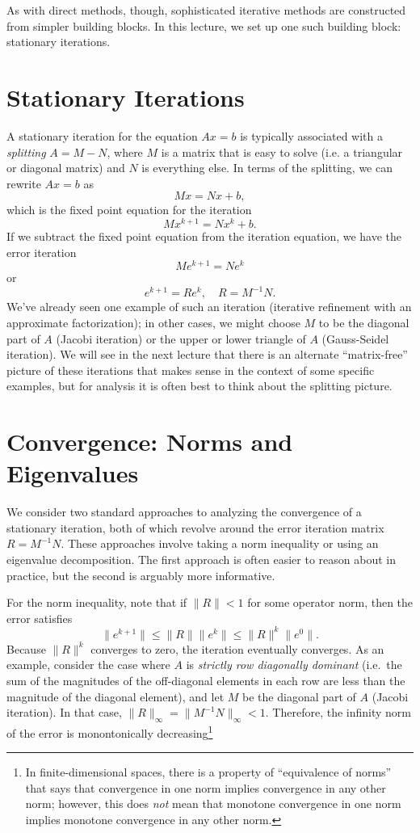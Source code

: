\documentclass[12pt, leqno]{article}
\begin{document}
As with direct methods, though, sophisticated iterative methods are
constructed from simpler building blocks.  In this lecture, we set up
one such building block: stationary iterations.

\section{Stationary Iterations}

A stationary iteration for the equation $Ax = b$ is typically
associated with a {\em splitting} $A = M-N$, where $M$ is a matrix
that is easy to solve (i.e. a triangular or diagonal matrix) and $N$
is everything else.  In terms of the splitting, we can rewrite
$Ax = b$ as
\[
  Mx = Nx + b,
\]
which is the fixed point equation for the iteration
\[
  Mx^{k+1} = Nx^{k} + b.
\]
If we subtract the fixed point equation from the iteration equation,
we have the error iteration
\[
  M e^{k+1} = N e^k
\]
or
\[
  e^{k+1} = R e^k, \quad R = M^{-1} N.
\]
We've already seen one example of such an iteration (iterative
refinement with an approximate factorization); in other cases,
we might choose $M$ to be the diagonal part of $A$ (Jacobi iteration)
or the upper or lower triangle of $A$ (Gauss-Seidel iteration).
We will see in the next lecture that there is an alternate
``matrix-free'' picture of these iterations that makes sense in the
context of some specific examples, but for analysis it is often best
to think about the splitting picture.

\section{Convergence: Norms and Eigenvalues}

We consider two standard approaches to analyzing the convergence of a
stationary iteration, both of which revolve around the error iteration
matrix $R = M^{-1} N$.  These approaches involve taking a norm
inequality or using an eigenvalue decomposition.  The first approach
is often easier to reason about in practice, but the second is
arguably more informative.

For the norm inequality, note that if $\|R\| < 1$ for some operator
norm, then the error satisfies
\[
  \|e^{k+1}\| \leq \|R\| \|e^k\| \leq \|R\|^k \|e^0\|.
\]
Because $\|R\|^k$ converges to zero, the iteration eventually
converges.  As an example, consider the case where $A$ is
{\em strictly row diagonally dominant} (i.e.~the sum of the
magnitudes of the off-diagonal elements in each row are less
than the magnitude of the diagonal element), and let $M$ be the diagonal
part of $A$ (Jacobi iteration).  In that case,
$\|R\|_\infty = \|M^{-1} N\|_\infty < 1$.  Therefore, the infinity
norm of the error is monontonically decreasing\footnote{%
  In finite-dimensional spaces, there is a property of ``equivalence
  of norms'' that says that convergence in one norm implies
  convergence in any other norm; however, this does {\em not} mean
  that monotone convergence in one norm implies monotone convergence
  in any other norm.}
\end{document}
